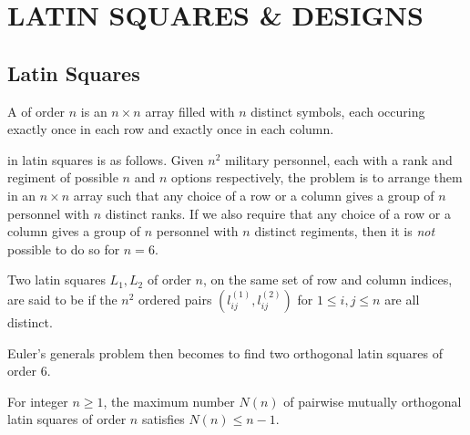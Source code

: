 \chapter{LATIN SQUARES \& DESIGNS}

\section{Latin Squares}

\begin{definition}
    A  of order $n$ is an $n \times n$ array filled with $n$ distinct symbols, each occuring exactly once in each row and exactly once in each column.
\end{definition}

 in latin squares is as follows. Given $n^{2}$ military personnel, each with a rank and regiment of possible $n$ and $n$ options respectively, the problem is to arrange them in an $n \times n$ array such that any choice of a row or a column gives a group of $n$ personnel with $n$ distinct ranks. If we also require that any choice of a row or a column gives a group of $n$ personnel with $n$ distinct regiments, then it is \textit{not} possible to do so for $n = 6$.

\begin{definition}
    Two latin squares $L_{1},L_{2}$ of order $n$, on the same set of row and column indices, are said to be  if the $n^{2}$ ordered pairs $(l_{ij}^{(1)},l_{ij}^{(2)})$ for $1 \leq i,j \leq n$ are all distinct.
\end{definition}

Euler's generals problem then becomes to find two orthogonal latin squares of order $6$.

\begin{theorem}
    For integer $n \geq 1$, the maximum number $N(n)$ of pairwise mutually orthogonal latin squares of order $n$ satisfies $N(n) \leq n-1$.
\end{theorem}

